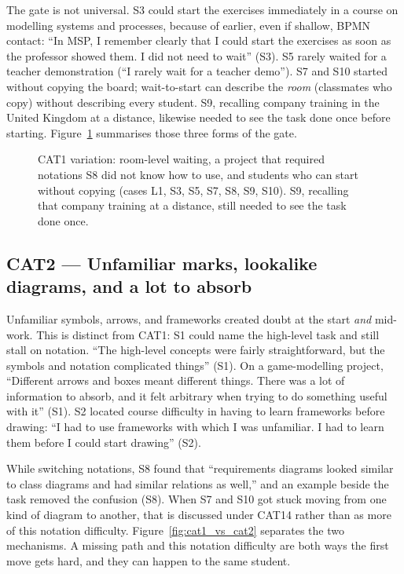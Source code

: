 The gate is not universal. S3 could start the exercises immediately in a course on modelling systems and processes, because of earlier, even if shallow, BPMN contact: ``In MSP, I remember clearly that I could start the exercises as soon as the professor showed them. I did not need to wait'' (S3). S5 rarely waited for a teacher demonstration (``I rarely wait for a teacher demo''). S7 and S10 started without copying the board; wait-to-start can describe the \emph{room} (classmates who copy) without describing every student. S9, recalling company training in the United Kingdom at a distance, likewise needed to see the task done once before starting. Figure~\ref{fig:cat1} summarises those three forms of the gate.

\begin{figure}[htbp]
\centering

\caption{CAT1 variation: room-level waiting, a project that required notations S8 did not know how to use, and students who can start without copying (cases L1, S3, S5, S7, S8, S9, S10). S9, recalling that company training at a distance, still needed to see the task done once.}
\label{fig:cat1}
\end{figure}

\subsection{CAT2 --- Unfamiliar marks, lookalike diagrams, and a lot to absorb}
\label{sec:cat2}

Unfamiliar symbols, arrows, and frameworks created doubt at the start \emph{and} mid-work. This is distinct from CAT1: S1 could name the high-level task and still stall on notation. ``The high-level concepts were fairly straightforward, but the symbols and notation complicated things'' (S1). On a game-modelling project, ``Different arrows and boxes meant different things. There was a lot of information to absorb, and it felt arbitrary when trying to do something useful with it'' (S1). S2 located course difficulty in having to learn frameworks before drawing: ``I had to use frameworks with which I was unfamiliar. I had to learn them before I could start drawing'' (S2).

While switching notations, S8 found that ``requirements diagrams looked similar to class diagrams and had similar relations as well,'' and an example beside the task removed the confusion (S8). When S7 and S10 got stuck moving from one kind of diagram to another, that is discussed under CAT14 rather than as more of this notation difficulty. Figure~\ref{fig:cat1_vs_cat2} separates the two mechanisms. A missing path and this notation difficulty are both ways the first move gets hard, and they can happen to the same student.

